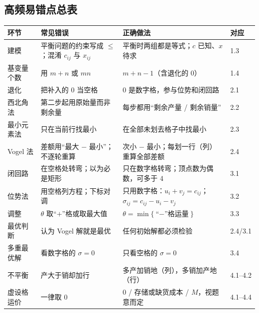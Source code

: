 \subsection*{高频易错点总表}
\begin{center}\small
\begin{tabularx}{\linewidth}{@{}p{2.4cm} X X l@{}}
\toprule
环节 & 常见错误 & 正确做法 & 对应\\
\midrule
建模 & 平衡问题的约束写成 $\le$；混淆 $c_{ij}$ 与 $x_{ij}$ & 平衡时两组都是等式；$c$ 已知、$x$ 待求 & 1.3\\
基变量个数 & 用 $m+n$ 或 $mn$ & $m+n-1$（含退化的 0） & 1.4\\
退化 & 把补入的 0 当空格 & 0 是数字格，参与位势和闭回路 & 2.1\\
西北角法 & 第二步起用原始量而非剩余量 & 每步都用“剩余产量 / 剩余销量” & 2.2\\
最小元素法 & 只在当前行找最小 & 在全部未划去格子中找最小 & 2.3\\
Vogel 法 & 差额用“最大 $-$ 最小”；不逐轮重算 & 次小 $-$ 最小；每划一行（列）重算全部差额 & 2.4\\
闭回路 & 在空格处转弯；以为必是矩形 & 只在数字格转弯；顶点数为偶数，可多于 4 & 3.1\\
位势法 & 用空格列方程；下标对调 & 只用数字格：$u_i+v_j=c_{ij}$；$\sigma_{ij}=c_{ij}-u_i-v_j$ & 3.2\\
调整 & $\theta$ 取“$+$”格或取最大值 & $\theta=\min\{\text{“$-$”格运量}\}$ & 3.3\\
最优判断 & 认为 Vogel 解就是最优 & 任何初始解都必须检验 & 2.4/3.1\\
多重最优解 & 看数字格的 $\sigma=0$ & 只看空格的 $\sigma=0$ & 3.4\\
不平衡 & 产大于销却加行 & 多产加销地（列），多销加产地（行） & 4.1--4.2\\
虚设格运价 & 一律取 0 & 0 / 存储或缺货成本 / $M$，视题意而定 & 4.1--4.4\\
\bottomrule
\end{tabularx}
\end{center}

